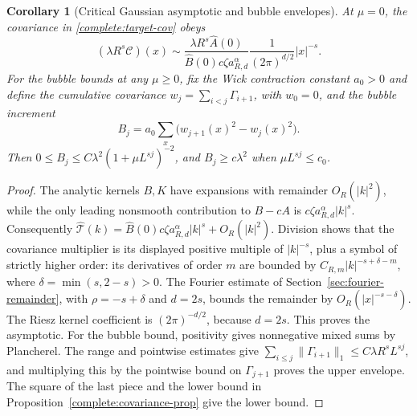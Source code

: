 \documentclass[11pt]{article}
\newtheorem{corollary}[proposition]{Corollary}
\begin{document}
\begin{corollary}[Critical Gaussian asymptotic and bubble envelopes]
\label{complete:covariance-consequences}
At \(\mu=0\), the covariance in
\eqref{complete:target-cov} obeys
\[
 (\lambda R^s\mathscr C)(x)\sim
 \frac{\lambda R^s\widehat A(0)}
      {\widehat B(0)c\zeta a_{R,d}^\alpha}
 \frac1{(2\pi)^{d/2}}|x|^{-s}.
\]
For the bubble bounds at any \(\mu\ge0\), fix the Wick contraction
constant \(a_0>0\) and define the
cumulative covariance \(w_j=\sum_{i<j}\Gamma_{i+1}\), with
\(w_0=0\), and the bubble increment
\[
 B_j=a_0\sum_x\bigl(w_{j+1}(x)^2-w_j(x)^2\bigr).
\]
Then \(0\le B_j\le C\lambda^2(1+\mu L^{sj})^{-2}\), and
\(B_j\ge c\lambda^2\) when \(\mu L^{sj}\le c_0\).
\end{corollary}
\begin{proof}
The analytic kernels \(B,K\) have expansions with remainder
\(O_R(|k|^2)\), while the only leading nonsmooth contribution to
\(B-cA\) is \(c\zeta a_{R,d}^\alpha|k|^s\).
Consequently \(\widehat{\mathscr T}(k)
=\widehat B(0)c\zeta a_{R,d}^\alpha|k|^s+O_R(|k|^2)\).
Division shows that the covariance multiplier is its displayed
positive multiple of \(|k|^{-s}\), plus a symbol of strictly higher
order: its derivatives of order \(m\) are bounded by
\(C_{R,m}|k|^{-s+\delta-m}\), where
\(\delta=\min(s,2-s)>0\). The Fourier estimate of Section~\ref{sec:fourier-remainder},
with \(\rho=-s+\delta\) and \(d=2s\), bounds the remainder by
\(O_R(|x|^{-s-\delta})\).
The Riesz kernel coefficient is \((2\pi)^{-d/2}\), because
\(d=2s\). This proves the asymptotic.
For the bubble bound, positivity gives nonnegative mixed sums by
Plancherel. The range and pointwise estimates give
\(\sum_{i\le j}\|\Gamma_{i+1}\|_1\le C\lambda R^sL^{sj}\), and multiplying
this by the pointwise bound on \(\Gamma_{j+1}\) proves the upper envelope.
The square of the last piece and the lower bound in
Proposition~\ref{complete:covariance-prop} give the lower bound.
\end{proof}
\end{document}
